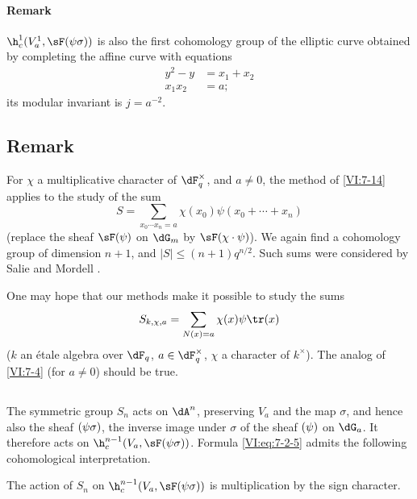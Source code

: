 \documentclass[oneside]{book}
\begin{document}
\paragraph{Remark}

$\h_c^1(V_a^1,\sF(\psi\sigma))$ is also the first cohomology group of 
the elliptic curve obtained by completing the affine curve with equations 
\begin{align*}
  y^2-y &= x_1+x_2 \\
  x_1 x_2 &= a \text{;} 
\end{align*}
its modular invariant is $j=a^{-2}$. 





\subsection{Remark}\label{VI:7-18}

For $\chi$ a multiplicative character of $\dF_q^\times$, and $a\ne 0$, the 
method of \ref{VI:7-14} applies to the study of the sum 
\[
  S = \sum_{x_0\dotsm x_n = a} \chi(x_0) \psi(x_0+\cdots + x_n) 
\]
(replace the sheaf $\sF(\psi)$ on $\dG_m$ by $\sF(\chi\cdot \psi)$). We 
again find a cohomology group of dimension $n+1$, and 
$|S|\leqslant (n+1)q^{n/2}$. Such sums were considered by 
Salie and Mordell \cite{mo73}.

One may hope that our methods make it possible to study the sums 
\[
  S_{k,\chi,a} = \sum_{N(x)=a} \chi(x) \psi \tr(x) 
\]
($k$ an étale algebra over $\dF_q$, $a\in \dF_q^\times$, $\chi$ a character of 
$k^\times$). The analog of \ref{VI:7-4} (for $a\ne 0$) should be true. 





\subsection{}\label{VI:7-19}

The symmetric group $S_n$ acts on $\dA^n$, preserving $V_a$ and 
the map $\sigma$, and hence also the sheaf $\sf(\psi\sigma)$, the inverse 
image under $\sigma$ of the sheaf $\sf(\psi)$ on $\dG_a$. It therefore acts 
on $\h_c^{n-1}(V_a,\sF(\psi\sigma))$. Formula \eqref{VI:eq:7-2-5} admits 
the following cohomological interpretation.





\begin{proposition_}\label{VI:7-20}
The action of $S_n$ on $\h_c^{n-1}(V_a,\sF(\psi\sigma))$ is multiplication 
by the sign character. 
\end{proposition_}
\end{document}
